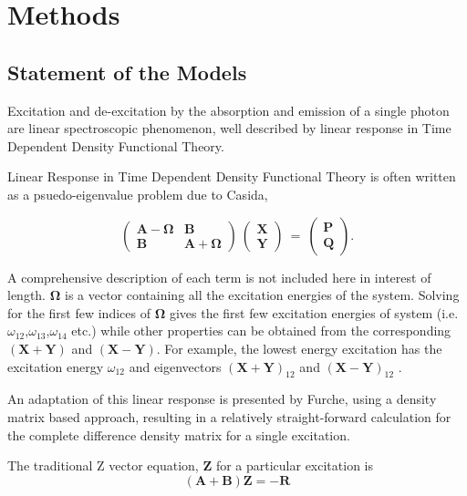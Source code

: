 \documentclass[11pt]{article}
\begin{document}
\section{Methods}

\subsection{Statement of the Models}

Excitation and de-excitation by the absorption and emission of a
single photon are linear spectroscopic phenomenon, well
described by linear response in Time Dependent Density
Functional Theory.  

Linear Response in Time Dependent Density Functional Theory is
often written as a psuedo-eigenvalue problem due to Casida,

\begin{equation}
   \label{eq:Casida}
   \left(\begin{array}{cc}\mathbf{A}-\mathbf{\Omega}&\mathbf{B}\
     \\\mathbf{B}&\mathbf{A}+\mathbf{\Omega}\end{array}\right)\
   \left(\begin{array}{cc}\mathbf{X}\\\mathbf{Y}\end{array}\right)\
   =\
   \left(\begin{array}{cc}\mathbf{P}\\\mathbf{Q}\end{array}\right).
\end{equation}

A comprehensive description of each term is not included here
in interest of length. $ \mathbf{\Omega} $ is a vector containing all the
excitation energies of the system. Solving for the first few
indices of $ \mathbf{\Omega}$ gives the first few excitation energies of
system (i.e. $ \omega_{12}$,$\omega_{13}$,$\omega_{14}$ etc.)
while other properties can be obtained from the corresponding
$(\mathbf{X+Y})$ and $(\mathbf{X-Y})$. 
For example, the lowest energy excitation
has the excitation energy $ \omega_{12} $ and eigenvectors
$(\mathbf{X+Y})_{12}$ and $(\mathbf{X-Y})_{12}$ .

An adaptation of this linear response is presented by Furche,
using a density matrix based approach, resulting in a
relatively straight-forward calculation for the complete
difference density matrix for a single
excitation.\cite{doi:10.1063/1.1508368}

The traditional Z vector equation, 
$ \mathbf{Z}$ for a particular excitation is 
\begin{equation}
   \label{eq:Zvector}
   (\mathbf{A}+\mathbf{B})\mathbf{Z} = -\mathbf{R}
\end{equation}
\end{document}

